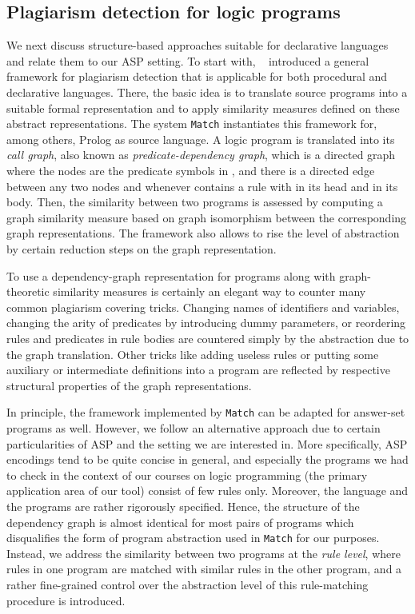 \documentclass{tlp}
\begin{document}
\subsection{Plagiarism detection  for logic programs}
We next discuss structure-based approaches suitable for declarative languages and relate them to our ASP setting.
To start with, ~ introduced a general framework for plagiarism detection that is applicable for
both procedural and declarative languages. 
There, the basic idea is to translate  source programs into a suitable formal representation and to apply similarity measures defined on these abstract representations. 
The system {\tt Match} instantiates this framework for, among others, Prolog  as source language.
A logic program   is translated into its \emph{call graph}, also known as \emph{predicate-dependency graph}, which is 
a directed graph  where the nodes are the predicate symbols in , and there is a directed edge between any  two
nodes  and  whenever  contains a rule with  in its head and  in its body.
Then, the similarity between two programs is assessed by computing a graph similarity measure based on graph isomorphism
between the corresponding graph representations. 
The framework also allows to rise the level of abstraction by certain reduction steps on the graph representation. 

To use a dependency-graph representation for programs along with graph-theoretic similarity measures is certainly
an elegant way to counter many common plagiarism covering tricks. 
Changing names of identifiers and variables, changing the arity of  predicates by introducing dummy parameters, or
reordering rules and predicates in rule bodies 
are countered simply by the abstraction due to the graph translation. Other tricks like adding useless rules  or putting
some auxiliary or intermediate definitions into a program are reflected by respective structural properties of the graph representations.

In principle, the framework implemented by {\tt Match} can be adapted for answer-set programs as well. 
However, we follow an alternative approach 
due to certain particularities of ASP and the 
setting we are interested in. 
More specifically,  ASP encodings tend to be quite concise in general, and especially the programs we had to check in the context of our courses on logic
programming (the primary application area of our tool) consist of few rules only. Moreover, the language and the 
programs are rather rigorously specified. 
Hence, the structure of the dependency graph is almost identical for most pairs of programs which disqualifies the form of program abstraction used in {\tt Match} for our purposes.   
Instead, we address the similarity between two programs at the \emph{rule level}, where rules in one program are matched with
 similar rules in the other program, and a rather fine-grained control over the abstraction level of this
rule-matching procedure is introduced.
 
\end{document}
